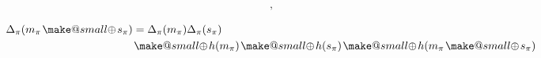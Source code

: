 \documentclass[twocolumn, aps, amsmath, amssymb, nofootinbib, superscriptaddress, longbibliography, doublefloatfix, table-of-contents, eqsecnum, rmp]{revtex4-2}
\makeatletter
\newcommand{\soplus}{{{\hspace{1pt}}{\mathbin{\mathpalette\make@small{\mathbin\oplus}}}}{\hspace{1pt}}}
\newcommand{\make@small}[2]{%
  \vcenter{\hbox{%
    \scalebox{0.6}{$\m@th#1#2$}%
  }}%
}
\makeatother
\begin{document}

\begin{align}
	[m_\pi \soplus s_\pi, \Delta_\pi(m_\pi\soplus s_\pi)],
\end{align}

\begin{align}
	\Delta_\pi(m_\pi\soplus s_\pi) &= \Delta_\pi(m_\pi) \Delta_\pi(s_\pi) \nonumber\\
	&\soplus h(m_\pi) \soplus h(s_\pi) \soplus h(m_\pi \soplus s_\pi)
\end{align}

\end{document}
